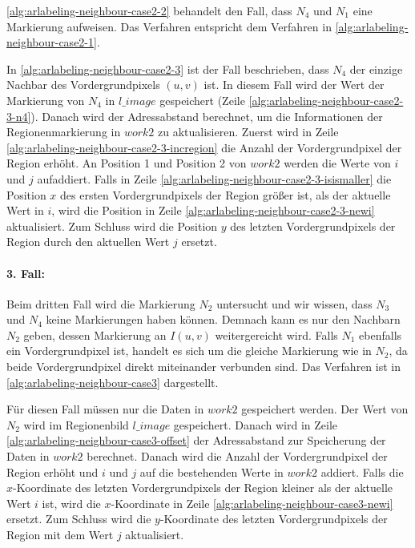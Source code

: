 

\autoref{alg:arlabeling-neighbour-case2-2} behandelt den Fall, dass $N_4$ und $N_1$ eine Markierung aufweisen. Das Verfahren entspricht dem Verfahren in \autoref{alg:arlabeling-neighbour-case2-1}.

In \autoref{alg:arlabeling-neighbour-case2-3} ist der Fall beschrieben, dass $N_4$ der einzige Nachbar des
 Vordergrundpixels $(u,v)$ ist. In diesem Fall wird der Wert der Markierung von $N_4$ in $\mathit{l\_image}$
 gespeichert (Zeile \ref{alg:arlabeling-neighbour-case2-3-n4}). Danach wird der Adressabstand berechnet, um die
 Informationen der Regionenmarkierung in $\mathit{work2}$ zu aktualisieren. Zuerst wird in Zeile
 \ref{alg:arlabeling-neighbour-case2-3-incregion} die Anzahl der Vordergrundpixel der Region erhöht. An Position 1 und
 Position 2 von $\mathit{work2}$ werden die Werte von $i$ und $j$ aufaddiert. Falls in Zeile
 \ref{alg:arlabeling-neighbour-case2-3-isismaller} die Position $x$ des ersten Vordergrundpixels der Region größer ist,
 als der aktuelle Wert in $i$, wird die Position in Zeile \ref{alg:arlabeling-neighbour-case2-3-newi} aktualisiert. Zum
 Schluss wird die Position $y$ des letzten Vordergrundpixels der Region durch den aktuellen Wert $j$ ersetzt.




\paragraph{3. Fall:} %
\label{par:fall_3_}
Beim dritten Fall wird die Markierung $N_2$ untersucht und wir wissen, dass $N_3$ und $N_4$ keine Markierungen haben
 können. Demnach kann es nur den Nachbarn $N_2$ geben, dessen Markierung an $I(u,v)$ weitergereicht wird. Falls $N_1$
 ebenfalls ein Vordergrundpixel ist, handelt es sich um die gleiche Markierung wie in $N_2$, da beide Vordergrundpixel
 direkt miteinander verbunden sind. Das Verfahren ist in \autoref{alg:arlabeling-neighbour-case3} dargestellt.



Für diesen Fall müssen nur die Daten in $\mathit{work2}$ gespeichert werden. Der Wert von $N_2$ wird im Regionenbild
 $\mathit{l\_image}$ gespeichert. Danach wird in Zeile \ref{alg:arlabeling-neighbour-case3-offset} der Adressabstand
 zur Speicherung der Daten in $\mathit{work2}$ berechnet. Danach wird die Anzahl der Vordergrundpixel der Region erhöht
 und $i$ und $j$ auf die bestehenden Werte in $\mathit{work2}$ addiert. Falls die $x$-Koordinate des letzten
 Vordergrundpixels der Region kleiner als der aktuelle Wert $i$ ist, wird die $x$-Koordinate in Zeile
 \ref{alg:arlabeling-neighbour-case3-newi} ersetzt. Zum Schluss wird die $y$-Koordinate des letzten Vordergrundpixels
 der Region mit dem Wert $j$ aktualisiert.

